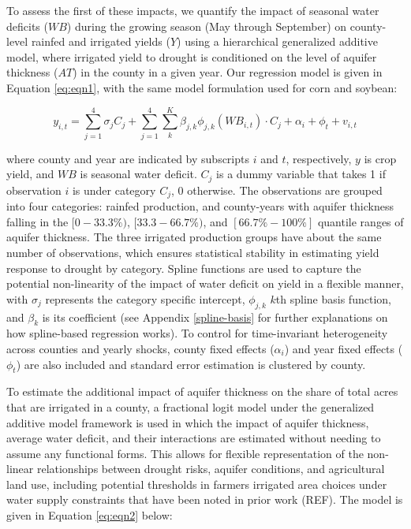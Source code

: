 \documentclass[
]{article}
\begin{document}
To assess the first of these impacts, we quantify the impact of seasonal water deficits (\(WB\)) during the growing season (May through September) on county-level rainfed and irrigated yields (\(Y\)) using a hierarchical generalized additive model, where irrigated yield to drought is conditioned on the level of aquifer thickness (\(AT\)) in the county in a given year. Our regression model is given in Equation \eqref{eq:eqn1}, with the same model formulation used for corn and soybean:

\begin{equation}
y_{i,t} = \sum_{j=1}^4 \sigma_j C_j + \sum_{j=1}^4 \sum_{k}^K \beta_{j,k}\phi_{j,k}(WB_{i,t})\cdot C_j  + \alpha_i + \phi_t + v_{i,t} \label{eq:eqn1}
\end{equation}

where county and year are indicated by subscripts \(i\) and \(t\), respectively, \(y\) is crop yield, and \(WB\) is seasonal water deficit. \(C_j\) is a dummy variable that takes 1 if observation \(i\) is under category \(C_j\), 0 otherwise. The observations are grouped into four categories: rainfed production, and county-years with aquifer thickness falling in the \([0-33.3\%)\), \([33.3-66.7\%)\), and \([66.7\% - 100\%]\) quantile ranges of aquifer thickness. The three irrigated production groups have about the same number of observations, which ensures statistical stability in estimating yield response to drought by category. Spline functions are used to capture the potential non-linearity of the impact of water deficit on yield in a flexible manner, with \(\sigma_j\) represents the category specific intercept, \(\phi_{j,k}\) \(k\)th spline basis function, and \(\beta_k\) is its coefficient (see Appendix \ref{spline-basis} for further explanations on how spline-based regression works). To control for time-invariant heterogeneity across counties and yearly shocks, county fixed effects (\(\alpha_i\)) and year fixed effects (\(\phi_t\)) are also included and standard error estimation is clustered by county.

To estimate the additional impact of aquifer thickness on the share of total acres that are irrigated in a county, a fractional logit model under the generalized additive model framework is used in which the impact of aquifer thickness, average water deficit, and their interactions are estimated without needing to assume any functional forms. This allows for flexible representation of the non-linear relationships between drought risks, aquifer conditions, and agricultural land use, including potential thresholds in farmers irrigated area choices under water supply constraints that have been noted in prior work (REF). The model is given in Equation \eqref{eq:eqn2} below:
\end{document}
